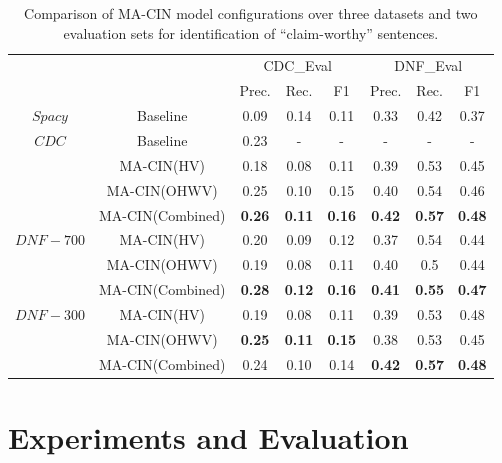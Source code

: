 \documentclass[11pt,a4paper]{article}
\begin{document}
\begin{table*}[ht]
\begin{center}\scriptsize
\begin{tabular}{cc@{\qquad}ccc@{\qquad}ccc}
  \toprule
  \multirow{2}{*}{\raisebox{-\heavyrulewidth}{Dataset}} & \multirow{2}{*}{\raisebox{-\heavyrulewidth}{Configuration}} & \multicolumn{3}{c}{CDC\_Eval} & \multicolumn{3}{c}{DNF\_Eval} \\
  \cmidrule{3-8}
  & & Prec. & Rec. & F1 & Prec. & Rec. & F1 \\
  \midrule
  $Spacy$ & Baseline & 0.09 & 0.14 & 0.11 & 0.33 & 0.42 & 0.37 \\
  \midrule
  $CDC$ & Baseline \cite{levy_context_2014} & 0.23 & - & - & - & - & - \\
   & MA-CIN(HV) & 0.18 & 0.08 & 0.11 & 0.39 & 0.53 & 0.45 \\
    & MA-CIN(OHWV) & 0.25 & 0.10 & 0.15 & 0.40 & 0.54 & 0.46 \\
    & MA-CIN(Combined) & \textbf{0.26} & \textbf{0.11} & \textbf{0.16} & \textbf{0.42} & \textbf{0.57} & \textbf{0.48} \\
  \midrule
  $DNF-700$ & MA-CIN(HV) & 0.20 & 0.09 & 0.12 & 0.37 & 0.54 & 0.44 \\
    & MA-CIN(OHWV) & 0.19 & 0.08 & 0.11 & 0.40 & 0.5 & 0.44 \\
    & MA-CIN(Combined) & \textbf{0.28} & \textbf{0.12} & \textbf{0.16} & \textbf{0.41} & \textbf{0.55} & \textbf{0.47} \\
    
  \midrule
  $DNF-300$ & MA-CIN(HV) & 0.19 & 0.08 & 0.11 & 0.39 & 0.53 & 0.48 \\
    & MA-CIN(OHWV) & \textbf{0.25} & \textbf{0.11} & \textbf{0.15} & 0.38 & 0.53 & 0.45 \\
    & MA-CIN(Combined) & 0.24 & 0.10 & 0.14 & \textbf{0.42} & \textbf{0.57} & \textbf{0.48} \\
  \bottomrule
\end{tabular}
\end{center}

\caption{\label{tab:results} Comparison of MA-CIN model configurations over three datasets and two evaluation sets for identification of ``claim-worthy'' sentences.}
\end{table*}

\section{Experiments and Evaluation}
\label{sec:exp}
\end{document}

